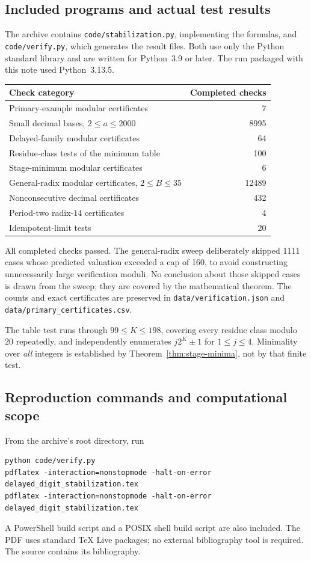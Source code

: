 \documentclass[11pt,a4paper]{article}
\theoremstyle{definition}
\begin{document}
\subsection{Included programs and actual test results}
The archive contains \texttt{code/stabilization.py}, implementing the
formulas, and \texttt{code/verify.py}, which generates the result files.
Both use only the Python standard library and are written for Python~3.9
or later. The run packaged with this note used Python~3.13.5.

\begin{center}
\begin{tabular}{lr}
\toprule
Check category & Completed checks\\
\midrule
Primary-example modular certificates & 7\\
Small decimal bases, $2\le a\le2000$ & 8995\\
Delayed-family modular certificates & 64\\
Residue-class tests of the minimum table & 100\\
Stage-minimum modular certificates & 6\\
General-radix modular certificates, $2\le B\le35$ & 12489\\
Nonconsecutive decimal certificates & 432\\
Period-two radix-$14$ certificates & 4\\
Idempotent-limit tests & 20\\
\bottomrule
\end{tabular}
\end{center}
All completed checks passed. The general-radix sweep deliberately skipped
1111 cases whose predicted valuation exceeded a cap of 160, to avoid
constructing unnecessarily large verification moduli. No conclusion about
those skipped cases is drawn from the sweep; they are covered by the
mathematical theorem. The counts and exact certificates are preserved in
\texttt{data/verification.json} and \texttt{data/primary\_certificates.csv}.

The table test runs through $99\le K\le198$, covering every residue class
modulo $20$ repeatedly, and independently enumerates $j2^K\pm1$ for
$1\le j\le4$. Minimality over \emph{all} integers is established by
Theorem~\ref{thm:stage-minima}, not by that finite test.

\subsection{Reproduction commands and computational scope}
From the archive's root directory, run
\begin{lstlisting}
python code/verify.py
pdflatex -interaction=nonstopmode -halt-on-error delayed_digit_stabilization.tex
pdflatex -interaction=nonstopmode -halt-on-error delayed_digit_stabilization.tex
\end{lstlisting}
A PowerShell build script and a POSIX shell build script are also included.
The PDF uses standard TeX Live packages; no external bibliography tool is
required. The source contains its bibliography.
\end{document}
